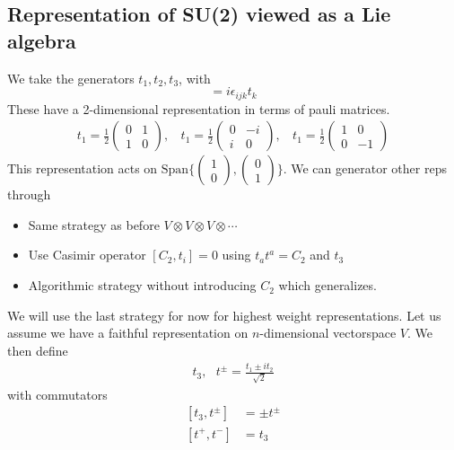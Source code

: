 \documentclass[a4paper,12pt]{article}
\begin{document}
\subsection{Representation of SU(2) viewed as a Lie algebra}
We take the generators $t_1,t_2,t_3$, with
\begin{equation}
[t_i,t_j]=i\epsilon_{ijk}t_k
\end{equation}
These have a 2-dimensional representation in terms of pauli matrices.
\begin{equation}
	\begin{aligned}
		t_1=\frac{1}{2}\begin{pmatrix}
			0 & 1 \\1 & 0
		\end{pmatrix},~~~~		t_1=\frac{1}{2}\begin{pmatrix}
		0 & -i \\i & 0
	\end{pmatrix},~~~~		t_1=\frac{1}{2}\begin{pmatrix}
	1 & 0 \\0 & -1
\end{pmatrix}
	\end{aligned}
\end{equation}
This representation acts on $\text{Span}\{\begin{pmatrix}
	1\\0
\end{pmatrix},\begin{pmatrix}
0\\1
\end{pmatrix}\}$. We can generator other reps through
\begin{itemize}
\item Same strategy as before $V\otimes V\otimes V\otimes \cdots$
\item Use Casimir operator $[C_2,t_i]=0$ using $t_at^a=C_2$ and $t_3$
\item Algorithmic strategy without introducing $C_2$ which generalizes.
\end{itemize}
We will use the last strategy for now for highest weight representations.
Let us assume we have a faithful representation on $n$-dimensional vectorspace $V$. We then define
\begin{equation}
	\begin{aligned}
		t_3,~~~t^\pm=\frac{t_1\pm i t_2}{\sqrt{2}}
	\end{aligned}
\end{equation}
with commutators
\begin{equation}
	\begin{aligned}
\left[t_3,t^\pm\right]&=\pm t^\pm\\
	[t^+,t^-]&= t_3
	\end{aligned}
\end{equation}
\end{document}
